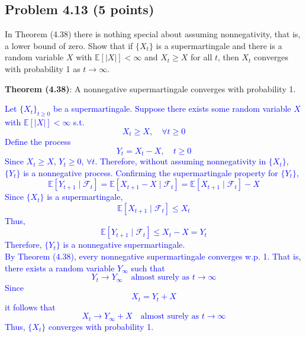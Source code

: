 \documentclass{article}
\begin{document}
\subsection*{Problem 4.13 (5 points)}
In Theorem (4.38) there is nothing special about assuming nonnegativity, that is, a lower bound of zero. Show that if $\{X_t\}$ is a supermartingale and there is a random variable $X$ with $\mathbb{E}[|X|] < \infty$ and $X_t \geq X$ for all $t$, then $X_t$ converges with probability 1 as $t \to \infty$.

\textbf{Theorem (4.38)}: A nonnegative supermartingale converges with probability 1.

\textcolor{blue}{Let $\{X_t\}_{t\ge0}$ be a supermartingale. Suppose there exists some random variable $X$ with $\mathbb{E}[|X|] < \infty$ s.t.
\[
X_t \ge X, \quad \forall t \ge 0
\]
Define the process
\[
Y_t = X_t - X, \quad t \ge 0
\]
Since $X_t \ge X$, $Y_t \ge 0$, $\forall t$. Therefore, without assuming nonnegativity in $\{X_t\}$, $\{Y_t\}$ is a nonnegative process. Confirming the supermartingale property for $\{Y_t\}$,
\[
\mathbb{E}[Y_{t+1}\mid \mathcal{F}_t] = \mathbb{E}[X_{t+1} - X \mid \mathcal{F}_t] 
= \mathbb{E}[X_{t+1}\mid \mathcal{F}_t] - X
\]
Since $\{X_t\}$ is a supermartingale,
\[
\mathbb{E}[X_{t+1}\mid \mathcal{F}_t] \le X_t
\]
Thus,
\[
\mathbb{E}[Y_{t+1}\mid \mathcal{F}_t] \le X_t - X = Y_t
\]
Therefore, $\{Y_t\}$ is a nonnegative supermartingale. \\
By Theorem (4.38), every nonnegative supermartingale converges w.p. 1. That is, there exists a random variable $Y_\infty$ such that
\[
Y_t \to Y_\infty \quad \text{almost surely as } t \to \infty
\]
Since
\[
X_t = Y_t + X
\]
it follows that
\[
X_t \to Y_\infty + X \quad \text{almost surely as } t \to \infty
\]
Thus, $\{X_t\}$ converges with probability 1.
}

\end{document}
